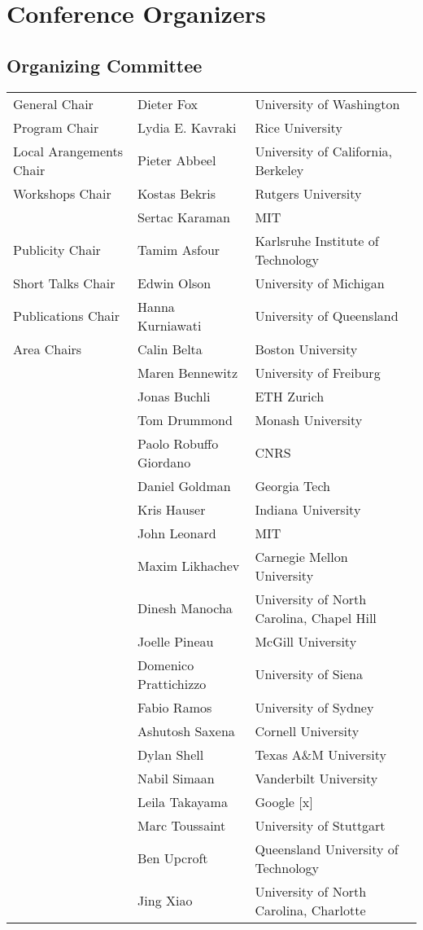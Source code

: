 \chapter{Conference Organizers}

\section{Organizing Committee}

\begin{tabular}{>{\raggedleft}p{5cm}p{4.5cm}>{\small}p{7cm}}
General Chair & Dieter Fox & University of Washington\\
Program Chair & Lydia E. Kavraki & Rice University\\
Local Arangements Chair & Pieter Abbeel & University of California, Berkeley\\
Workshops Chair & Kostas Bekris & Rutgers University\\
& Sertac Karaman & MIT\\
Publicity Chair & Tamim Asfour & Karlsruhe Institute of Technology\\
Short Talks Chair & Edwin Olson & University of Michigan\\
Publications Chair & Hanna Kurniawati & University of Queensland\\[5mm]

Area Chairs & Calin Belta & Boston University\\
& Maren Bennewitz & University of Freiburg\\
& Jonas Buchli & ETH Zurich\\
& Tom Drummond & Monash University\\
& Paolo Robuffo Giordano & CNRS \\
& Daniel Goldman & Georgia Tech \\
& Kris Hauser & Indiana University \\
& John Leonard & MIT \\
& Maxim Likhachev & Carnegie Mellon University \\
& Dinesh Manocha & University of North Carolina, Chapel Hill\\
& Joelle Pineau & McGill University \\
& Domenico Prattichizzo & University of Siena \\
& Fabio Ramos & University of Sydney \\
& Ashutosh Saxena & Cornell University \\
& Dylan Shell & Texas A\&M University \\
& Nabil Simaan & Vanderbilt University \\
& Leila Takayama & Google [x] \\
& Marc Toussaint & University of Stuttgart \\
& Ben Upcroft & Queensland University of Technology \\
& Jing Xiao & University of North Carolina, Charlotte\\[5mm]


\end{tabular}
